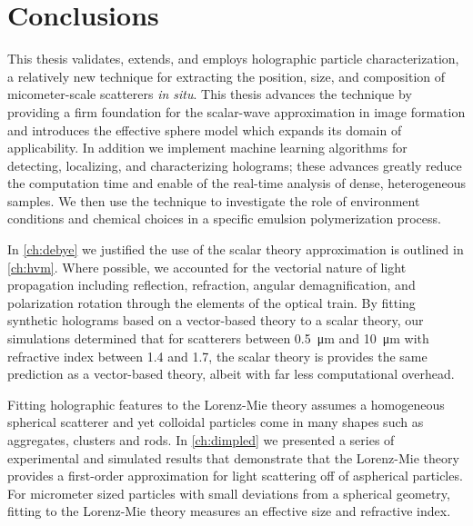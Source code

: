 \chapter{Conclusions}
\label{ch:conclusion}



This thesis validates, extends, and employs holographic
particle characterization, a relatively new technique
for extracting the position, size, and composition
of micometer-scale scatterers \emph{in situ}. This
thesis advances the technique by providing a
firm foundation for the scalar-wave approximation
in image formation and introduces the effective
sphere model which expands its domain of applicability.
In addition we implement machine learning algorithms for
detecting, localizing, and characterizing holograms; these
advances greatly reduce the computation time and enable of
the real-time analysis of dense, heterogeneous samples.
We then use the technique to investigate the role of
environment conditions and chemical choices in
a specific emulsion polymerization process.

In \autoref{ch:debye} we justified the use of the scalar theory
approximation is outlined in \autoref{ch:hvm}.
Where possible, we accounted for the vectorial nature
of light propagation including reflection, refraction,
angular demagnification, and polarization rotation
through the elements of the optical train. By fitting synthetic holograms
based on a vector-based theory to a scalar theory,
our simulations determined that for scatterers between \SI{0.5}{\um}
and \SI{10}{\um} with refractive index between \SI{1.4}{} and \SI{1.7}{},
the scalar theory is provides the same prediction as a vector-based theory,
albeit with far less computational overhead. 

Fitting holographic features to the Lorenz-Mie theory
assumes a homogeneous spherical scatterer and yet colloidal particles
come in many shapes such as aggregates, clusters and rods. In \autoref{ch:dimpled}
we presented a series of experimental and simulated results that demonstrate
that the Lorenz-Mie theory provides a first-order approximation for light scattering
off of aspherical particles. For micrometer sized particles with small deviations
from a spherical geometry, fitting to the Lorenz-Mie theory measures
an effective size and refractive index.

